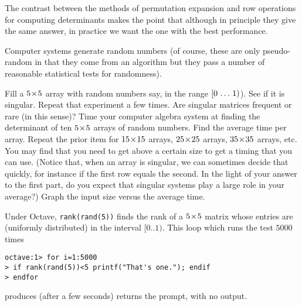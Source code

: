 The contrast between the methods of permutation expansion and row operations
for computing determinants 
makes the point that although in principle they give the same answer, 
in practice we want the one with the best performance.


\begin{exercises}
  \item 
    Computer systems generate random numbers
    (of course, these are only pseudo-random in that they come from
    an algorithm but they 
    pass a number of reasonable statistical tests for randomness).
    \begin{exparts}
      \partsitem Fill a $5 \! \times \! 5$ array with random numbers say, in the
        range $[0\,\ldots\, 1)$).
        See if it is singular.
        Repeat that experiment a few times.
        Are singular matrices frequent or rare (in this sense)?
      \partsitem Time your computer algebra system at finding the
        determinant of ten $5 \! \times \! 5$ arrays of random numbers.
        Find the average time per array.
        Repeat the prior item for $15 \! \times \! 15$ arrays,
        $25 \! \times \! 25$ arrays, $35 \! \times \! 35$ arrays, etc.
        You may find that you need to get above a certain size
        to get a timing that you can use. 
        (Notice that, when an array is singular, we can sometimes decide that
        quickly,
        for instance if the first row equals the second.
        In the light of your answer to the first part, do you expect that 
        singular systems play a large role in your average?)
      \partsitem Graph the input size versus the average time.
    \end{exparts}
    \begin{answer}
      \begin{exparts}
        \partsitem Under Octave, \texttt{rank(rand(5))} finds the
          rank of a $5 \! \times \! 5$ matrix whose entries are (uniformly
          distributed) in the interval $[0..1)$.
          This loop which runs the test $5000$ times
\begin{lstlisting}
octave:1> for i=1:5000
> if rank(rand(5))<5 printf("That's one."); endif
> endfor
\end{lstlisting}  
          produces (after a few seconds) returns the prompt, with no output.


\end{exparts}
\end{answer}
\end{exercises}
